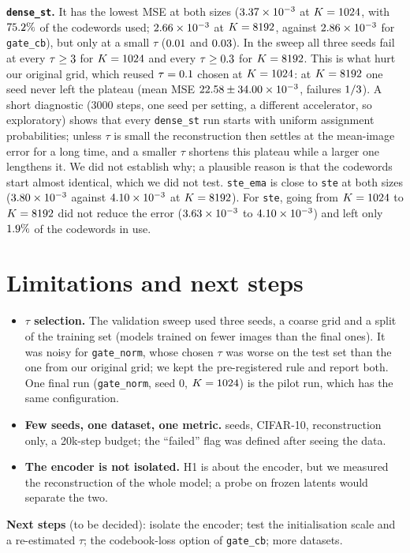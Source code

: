 \documentclass[11pt]{article}
\newcommand{\est}[1]{\texttt{#1}}
\begin{document}
\textbf{\est{dense\_st}.} It has the lowest MSE at both sizes ($3.37\times10^{-3}$ at
$K=1024$, with $75.2\%$ of the codewords used; $2.66\times10^{-3}$ at
$K=8192$, against $2.86\times10^{-3}$ for \est{gate\_cb}), but only at a small
$\tau$ ($0.01$ and $0.03$). In the sweep all three seeds fail at
every $\tau\ge3$ for $K=1024$ and every $\tau\ge0.3$
for $K=8192$. This is what hurt our original grid, which reused $\tau=0.1$ chosen at
$K=1024$: at $K=8192$ one seed never left the plateau (mean MSE
$22.58\pm34.00\times10^{-3}$, failures
$1/3$). A short diagnostic (3000 steps, one seed per setting, a different
accelerator, so exploratory) shows that every \est{dense\_st} run starts with uniform assignment
probabilities; unless $\tau$ is small the reconstruction then settles at the mean-image error for
a long time, and a smaller $\tau$ shortens this plateau while a larger one lengthens it. We did not
establish why; a plausible reason is that the codewords start almost identical, which we did not
test.
\est{ste\_ema} is close to \est{ste} at both sizes ($3.80\times10^{-3}$ against
$4.10\times10^{-3}$ at $K=8192$). For \est{ste}, going from $K=1024$ to $K=8192$ did not
reduce the error ($3.63\times10^{-3}$ to $4.10\times10^{-3}$) and left only
$1.9\%$ of the codewords in use.

\section{Limitations and next steps}
\begin{itemize}\setlength\itemsep{1pt}
\item \textbf{$\tau$ selection.} The validation sweep used three seeds, a coarse grid and a split of
  the training set (models trained on fewer images than the final ones). It was noisy for
  \est{gate\_norm}, whose chosen $\tau$ was worse on the test set than the one from our original
  grid; we kept the pre-registered rule and report both. One final run (\est{gate\_norm}, seed 0,
  $K=1024$) is the pilot run, which has the same configuration.
\item \textbf{Few seeds, one dataset, one metric.} \resNSeeds{} seeds, CIFAR-10, reconstruction only, a
  20k-step budget; the ``failed'' flag was defined after seeing the data.
\item \textbf{The encoder is not isolated.} H1 is about the encoder, but we measured the
  reconstruction of the whole model; a probe on frozen latents would separate the two.
\end{itemize}
\textbf{Next steps} (to be decided): isolate the encoder; test the initialisation scale and a
re-estimated $\tau$; the codebook-loss option of \est{gate\_cb}; more datasets.



\end{document}

